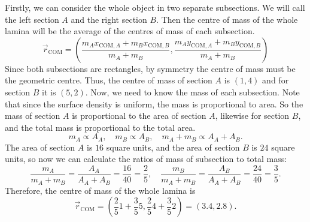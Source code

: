 \documentclass[../classical_mechanics.tex]{subfiles}
\begin{document}
\begin{example}
            Firstly, we can consider the whole object in two separate subsections.
            We will call the left section $A$ and the right section $B$.
            Then the centre of mass of the whole lamina will be the average of the centres of mass of each subsection.
            \begin{equation}
                \vec{r}_\text{COM}=\left(\frac{m_A x_{\text{COM},A}+m_B x_{\text{COM},B}}{m_A+m_B},\frac{m_A y_{\text{COM},A}+m_B y_{\text{COM},B}}{m_A+m_B}\right)
            \end{equation}
            Since both subsections are rectangles, by symmetry the centre of mass must be the geometric centre.
            Thus, the centre of mass of section $A$ is $(1,4)$ and for section $B$ it is $(5,2)$.
            Now, we need to know the mass of each subsection.
            Note that since the surface density is uniform, the mass is proportional to area.
            So the mass of section $A$ is proportional to the area of section $A$, likewise for section $B$, and the total mass is proportional to the total area.
            \begin{equation}
                m_A\propto A_A,\quad m_B\propto A_B,\quad m_A+m_B\propto A_A+A_B.
            \end{equation}
            The area of section $A$ is $16$ square units, and the area of section $B$ is $24$ square units, so now we can calculate the ratios of mass of subsection to total mass:
            \begin{equation}
                \frac{m_A}{m_A+m_B}=\frac{A_A}{A_A+A_B}=\frac{16}{40}=\frac{2}{5},\quad\frac{m_B}{m_A+m_B}=\frac{A_B}{A_A+A_B}=\frac{24}{40}=\frac{3}{5}.
            \end{equation}
            Therefore, the centre of mass of the whole lamina is
            \begin{equation}
                \vec{r}_\text{COM}=\left(\frac{2}{5}1+\frac{3}{5}5,\frac{2}{5}4+\frac{3}{5}2\right)=(3.4,2.8).
            \end{equation}
        \end{example}
\end{document}
